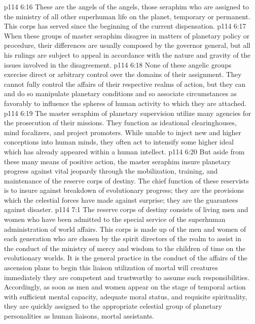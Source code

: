 \pc \vs p114 6:16 \bibnobreakspace {} These are the angels of the angels, those seraphim who are assigned to the ministry of all other superhuman life on the planet, temporary or permanent. This corps has served since the beginning of the current dispensation.
\pc \vs p114 6:17 When these groups of master seraphim disagree in matters of planetary policy or procedure, their differences are usually composed by the governor general, but all his rulings are subject to appeal in accordance with the nature and gravity of the issues involved in the disagreement.
\vs p114 6:18 None of these angelic groups exercise direct or arbitrary control over the domains of their assignment. They cannot fully control the affairs of their respective realms of action, but they can and do so manipulate planetary conditions and so associate circumstances as favorably to influence the spheres of human activity to which they are attached.
\vs p114 6:19 The master seraphim of planetary supervision utilize many agencies for the prosecution of their missions. They function as ideational clearinghouses, mind focalizers, and project promoters. While unable to inject new and higher conceptions into human minds, they often act to intensify some higher ideal which has already appeared within a human intellect.
\vs p114 6:20 But aside from these many means of positive action, the master seraphim insure planetary progress against vital jeopardy through the mobilization, training, and maintenance of the reserve corps of destiny. The chief function of these reservists is to insure against breakdown of evolutionary progress; they are the provisions which the celestial forces have made against surprise; they are the guarantees against disaster.\plusone
{}
\vs p114 7:1 The reserve corps of destiny consists of living men and women who have been admitted to the special service of the superhuman administration of world affairs. This corps is made up of the men and women of each generation who are chosen by the spirit directors of the realm to assist in the conduct of the ministry of mercy and wisdom to the children of time on the evolutionary worlds. It is the general practice in the conduct of the affairs of the ascension plans to begin this liaison utilization of mortal will creatures immediately they are competent and trustworthy to assume such responsibilities. Accordingly, as soon as men and women appear on the stage of temporal action with sufficient mental capacity, adequate moral status, and requisite spirituality, they are quickly assigned to the appropriate celestial group of planetary personalities as human liaisons, mortal assistants.
